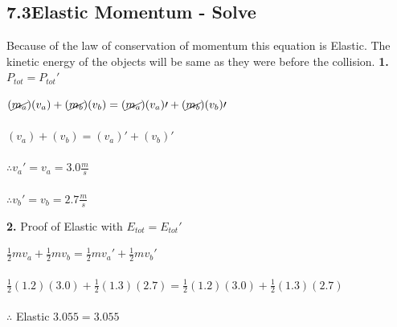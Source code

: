\subsection*{7.3\hspace*{0.5cm}Elastic Momentum - Solve}
Because of the law of conservation of momentum this equation is Elastic. The kinetic energy of the objects will be same as they were before the collision.\newline\newline
\textbf{1.} $P_{tot} = P_{tot}\prime$ \\
\begin{adjustwidth}{0.6cm}{0pt}
    $(\cancel{m_{a}})({v}_{a}) + (\cancel{m_{b}})({v}_{b}) = (\cancel{m_{a}})({v}_{a})\prime + (\cancel{m_{b}})({v}_{b})\prime$ \\\\
    $({v}_{a}) + ({v}_{b}) = ({v}_{a})\prime + ({v}_{b})\prime$ \\\\
    $\therefore v_{a}\prime = v_{a} = 3.0\frac{m}{s}$ \\\\
    $\therefore v_{b}\prime = v_{b} = 2.7\frac{m}{s}$
\end{adjustwidth}\vspace*{15pt}
\textbf{2.} Proof of Elastic with $E_{tot} = E_{tot}\prime$ \\
\begin{adjustwidth}{0.6cm}{0pt}
    $\frac{1}{2}mv_{a} + \frac{1}{2}mv_{b} = \frac{1}{2}mv_{a}\prime + \frac{1}{2}mv_{b}\prime$ \\\\
    $\frac{1}{2}(1.2)(3.0) + \frac{1}{2}(1.3)(2.7) = \frac{1}{2}(1.2)(3.0) + \frac{1}{2}(1.3)(2.7)$ \\\\
    $\therefore$ Elastic $3.055 = 3.055$
\end{adjustwidth}\vspace*{15pt}